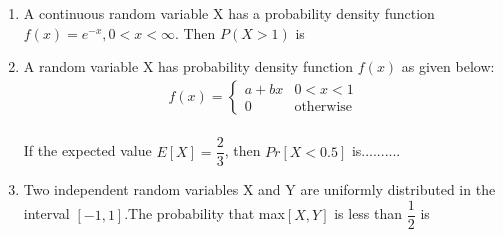 \documentclass[journal,12pt,twocolumn]{IEEEtran}
\begin{document}
\begin{enumerate}
\begin{enumerate}
\end{enumerate}
%
\solution


\item A continuous random variable X has a probability density function $f(x) = e^{-x}, 0<x<\infty$. Then $P(X>1)$ is
\begin{enumerate}
\end{enumerate}
%
\solution


\item A random variable X has probability density function $f(x)$ as given below:\\
\begin{align}
f(x) =
\begin{cases}
a+bx
&  0<x<1
\\
0
& \text{otherwise}
\end{cases}
\label{a}
\end{align}
\\
If the expected value $E[X]=\dfrac{2}{3}$, then $Pr[X<0.5]$ is..........
\\
\solution



\item Two independent random variables X and Y are uniformly distributed in the interval $[-1,1]$.The probability that max$[X,Y]$ is less than $\dfrac{1}{2}$ is

\begin{enumerate}
\begin{multicols}{4}
\setlength\itemsep{2em}


\end{multicols}
\end{enumerate}
\end{enumerate}
\end{document}
